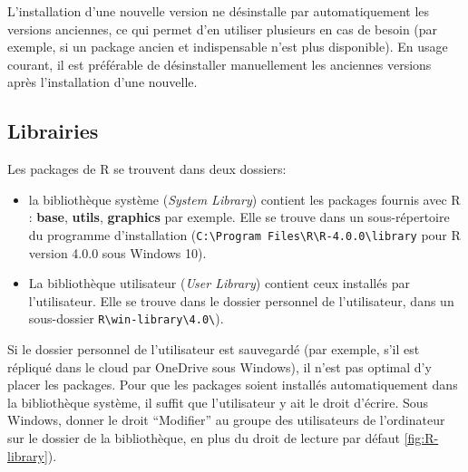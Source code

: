 \documentclass[
  12pt,
  french,
  a4paper,
  extrafontsizes,onecolumn,openright
  ]{memoir}
\providecommand{\tightlist}{%
  \setlength{\itemsep}{0pt}\setlength{\parskip}{0pt}}
\begin{document}
L'installation d'une nouvelle version ne désinstalle par automatiquement les versions anciennes, ce qui permet d'en utiliser plusieurs en cas de besoin (par exemple, si un package ancien et indispensable n'est plus disponible).
En usage courant, il est préférable de désinstaller manuellement les anciennes versions après l'installation d'une nouvelle.

\hypertarget{sec:librairies}{%
\subsection{Librairies}\label{sec:librairies}}

Les packages de R se trouvent dans deux dossiers:

\begin{itemize}
\tightlist
\item
  la bibliothèque système (\emph{System Library}) contient les packages fournis avec R : \textbf{base}, \textbf{utils}, \textbf{graphics} par exemple.
  Elle se trouve dans un sous-répertoire du programme d'installation (\texttt{C:\textbackslash{}Program\ Files\textbackslash{}R\textbackslash{}R-4.0.0\textbackslash{}}\break\texttt{library} pour R version 4.0.0 sous Windows 10).
\item
  La bibliothèque utilisateur (\emph{User Library}) contient ceux installés par l'utilisateur.
  Elle se trouve dans le dossier personnel de l'utilisateur, dans un sous-dossier \texttt{R\textbackslash{}win-library\textbackslash{}4.0\textbackslash{}}).
\end{itemize}

Si le dossier personnel de l'utilisateur est sauvegardé (par exemple, s'il est répliqué dans le cloud par OneDrive sous Windows), il n'est pas optimal d'y placer les packages.
Pour que les packages soient installés automatiquement dans la bibliothèque système, il suffit que l'utilisateur y ait le droit d'écrire.
Sous Windows, donner le droit \enquote{Modifier} au groupe des utilisateurs de l'ordinateur sur le dossier de la bibliothèque, en plus du droit de lecture par défaut \ref{fig:R-library}).



\scriptsize
\end{document}

